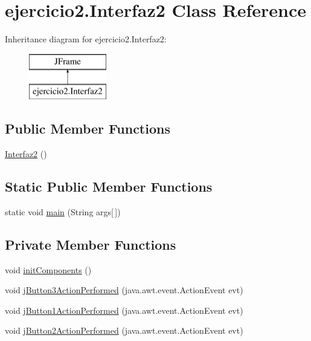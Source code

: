 \hypertarget{classejercicio2_1_1_interfaz2}{}\section{ejercicio2.\+Interfaz2 Class Reference}
\label{classejercicio2_1_1_interfaz2}
Inheritance diagram for ejercicio2.\+Interfaz2\+:\begin{figure}[H]
\begin{center}
\leavevmode
\includegraphics[height=2.000000cm]{classejercicio2_1_1_interfaz2}
\end{center}
\end{figure}
\subsection*{Public Member Functions}
\begin{DoxyCompactItemize}
\item 
\mbox{\hyperlink{classejercicio2_1_1_interfaz2_a81dcd7ee80d8193ffc7e1775f4a598d7}{Interfaz2}} ()
\end{DoxyCompactItemize}
\subsection*{Static Public Member Functions}
\begin{DoxyCompactItemize}
\item 
static void \mbox{\hyperlink{classejercicio2_1_1_interfaz2_a3300b7f5dc73c64e416e9616a3b4ae19}{main}} (String args\mbox{[}$\,$\mbox{]})
\end{DoxyCompactItemize}
\subsection*{Private Member Functions}
\begin{DoxyCompactItemize}
\item 
void \mbox{\hyperlink{classejercicio2_1_1_interfaz2_a24831c788d3bdb97c54d540dbaebe99d}{init\+Components}} ()
\item 
void \mbox{\hyperlink{classejercicio2_1_1_interfaz2_a5a9fe11c8a0e571dc802502ae085bb59}{j\+Button3\+Action\+Performed}} (java.\+awt.\+event.\+Action\+Event evt)
\item 
void \mbox{\hyperlink{classejercicio2_1_1_interfaz2_a615dc098c291d5ae182d63fedd6b030d}{j\+Button1\+Action\+Performed}} (java.\+awt.\+event.\+Action\+Event evt)
\item 
void \mbox{\hyperlink{classejercicio2_1_1_interfaz2_a3eb4f2b32d3fd61ab73e7fa5e272d9ef}{j\+Button2\+Action\+Performed}} (java.\+awt.\+event.\+Action\+Event evt)
\end{DoxyCompactItemize}
